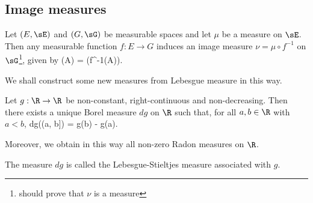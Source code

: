 \subsection{Image measures}

\begin{definition}\label{def:image_measure}
Let $(E, \sE)$ and $(G, \sG)$ be measurable spaces and let $\mu$ be a measure on $\sE$. Then any measurable function $f : E\to G$ induces an image measure $\nu = \mu \circ f^{-1}$ on $\sG$\footnote{should prove that $\nu$ is a measure}, given by
\be
\nu(A) = \mu(f^{-1}(A)).
\ee
\end{definition}

We shall construct some new measures from Lebesgue measure in this way.


\begin{theorem}\label{thm:existence_radon}
Let $g : \R \to \R$ be non-constant, right-continuous and non-decreasing. Then there exists a unique Borel measure $dg$ on $\R$ such that, for all $a, b \in \R$ with $a < b$,
\be
dg((a, b]) = g(b) - g(a).
\ee

Moreover, we obtain in this way all non-zero Radon measures on $\R$.

The measure $dg$ is called the Lebesgue-Stieltjes measure associated with $g$.
\end{theorem}
